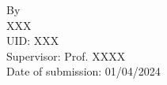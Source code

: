 \begin{titlepage}
\begin{center}
\vspace{40pt} %


\begin{center}
    {By\\
    XXX\\ %
    UID: XXX\\[10pt] %
    
    Supervisor: Prof. XXXX\\ %
    Date of submission: 01/04/2024} %
\end{center}

\vfill
\end{center}

\end{titlepage}



